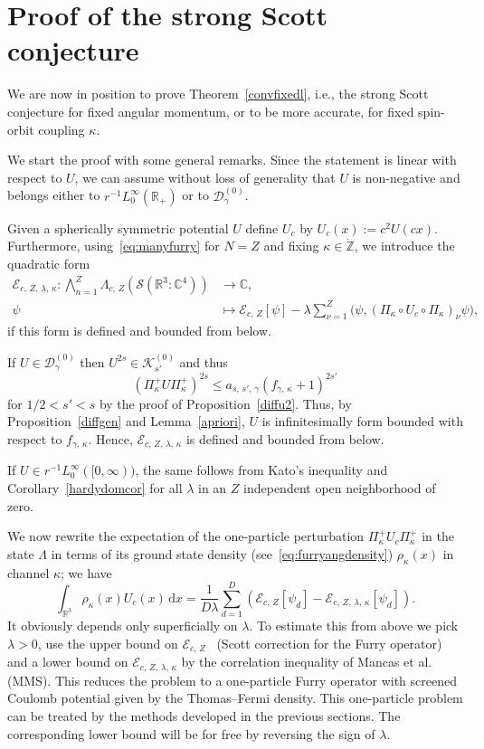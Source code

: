 \documentclass[10pt]{amsart}
\theoremstyle{definition}
\newcommand*\dx{\mathrm{d}x}
\newcommand*\cz{\mathbb{C}}
\newcommand*\gz{\mathbb{Z}}
\newcommand*\rz{\mathbb{R}}
\newcommand*\zp{\dot{\gz}}
\newcommand*\cD{\mathcal{D}}
\newcommand*\cE{\mathcal{E}}
\newcommand*\cK{\mathcal{K}}
\newcommand*\cS{\mathcal{S}}
\begin{document}
\section{Proof of the strong Scott conjecture}
We are now in position to prove Theorem~\ref{convfixedl}, i.e., the strong Scott conjecture for fixed angular momentum, or to be more accurate, for fixed spin-orbit coupling $\kappa$.

We start the proof with some general remarks. Since the statement is linear with respect to $U$, we can assume without loss of generality that $U$ is non-negative and belongs either to $r^{-1}L^\infty_0 (\rz_+)$ or to $\cD_\gamma^{(0)}$.

Given a spherically symmetric potential $U$ define $U_c$ by $U_c(x):=c^2U(cx)$. Furthermore, using~\eqref{eq:manyfurry} for $N=Z$ and fixing $\kappa\in\zp$, we introduce the quadratic form
\begin{equation}
\begin{split}
\cE_{c,\,Z,\,\lambda,\,\kappa}:\bigwedge_{n=1}^Z\Lambda_{c,\,Z}\left(\cS\left(\rz^3:\cz^4\right)\right) &\rightarrow\cz,\\
\psi &\mapsto \cE_{c,\,Z}[\psi]-\lambda \sum_{\nu=1}^Z\big(\psi,\left(\Pi_\kappa\circ U_c\circ\Pi_\kappa\right)_\nu\psi\big),
\end{split}
\end{equation}
if this form is defined and bounded from below.

If $U\in\cD_\gamma^{(0)}$ then $U^{2s}\in\cK_{s'}^{(0)}$ and thus
\[
\left(\Pi^+_{\kappa}U\Pi_{\kappa}^+\right)^{2s} \leq a_{s,\,s',\,\gamma}\left(f_{\gamma,\,\kappa}+1\right)^{2s'}
\]
for $1/2<s'<s$ by the proof of Proposition~\ref{diffu2}. Thus, by Proposition~\ref{diffgen} and Lemma~\ref{apriori}, $U$ is infinitesimally form bounded with respect to $f_{\gamma,\,\kappa}$. Hence, $\cE_{c,\,Z,\,\lambda,\,\kappa}$ is defined and bounded from below.

If $U\in r^{-1}L^\infty_0 ([0,\infty))$, the same follows from Kato's inequality and Corollary~\ref{hardydomcor} for all $\lambda$ in an $Z$ independent open neighborhood of zero.

We now rewrite the expectation of the one-particle perturbation $\Pi^+_\kappa U_c\Pi^+_\kappa$ in the state $\Lambda$ in terms of its ground state density (see~\eqref{eq:furryangdensity}) $\rho_{\kappa}(x)$ in channel $\kappa$; we have
\begin{equation}\label{eq:4.2}
\int_{\rz^3} \rho_\kappa(x)U_c(x)\,\dx = \frac{1}{D\lambda}\sum_{d=1}^D\left(\cE_{c,\,Z}[\psi_d]-\cE_{c,\,Z,\,\lambda,\,\kappa}[\psi_d]\right).
\end{equation}
It obviously depends only superficially on $\lambda$. To estimate this from above we pick $\lambda>0$, use the upper bound on $\cE_{c,\,Z}$~\cite{HandrekSiedentop2015} (Scott correction for the Furry operator) and a lower bound on $\cE_{c,\,Z,\,\lambda,\,\kappa}$ by the correlation inequality of Mancas et al.~\cite{Mancasetal2004} (MMS). This reduces the problem to a one-particle Furry operator with screened Coulomb potential given by the Thomas--Fermi density. This one-particle problem can be treated by the methods developed in the previous sections. The corresponding lower bound will be for free by reversing the sign of $\lambda$.
\end{document}
